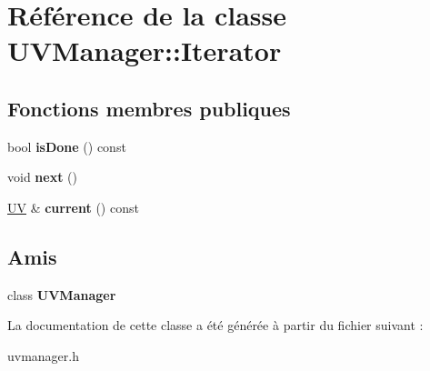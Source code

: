\hypertarget{class_u_v_manager_1_1_iterator}{\section{Référence de la classe U\+V\+Manager\+:\+:Iterator}
\label{class_u_v_manager_1_1_iterator}
}
\subsection*{Fonctions membres publiques}
\begin{DoxyCompactItemize}
\item 
\hypertarget{class_u_v_manager_1_1_iterator_a3ec3a33ce7a203f1cfe41e270c2d5618}{bool {\bfseries is\+Done} () const }\label{class_u_v_manager_1_1_iterator_a3ec3a33ce7a203f1cfe41e270c2d5618}

\item 
\hypertarget{class_u_v_manager_1_1_iterator_a01d51088890a5e83e96407bbc5ca919e}{void {\bfseries next} ()}\label{class_u_v_manager_1_1_iterator_a01d51088890a5e83e96407bbc5ca919e}

\item 
\hypertarget{class_u_v_manager_1_1_iterator_a1629af42307532caed05e2bec601d48d}{\hyperlink{class_u_v}{U\+V} \& {\bfseries current} () const }\label{class_u_v_manager_1_1_iterator_a1629af42307532caed05e2bec601d48d}

\end{DoxyCompactItemize}
\subsection*{Amis}
\begin{DoxyCompactItemize}
\item 
\hypertarget{class_u_v_manager_1_1_iterator_a335ec2026467669b89518b0c67372f3b}{class {\bfseries U\+V\+Manager}}\label{class_u_v_manager_1_1_iterator_a335ec2026467669b89518b0c67372f3b}

\end{DoxyCompactItemize}


La documentation de cette classe a été générée à partir du fichier suivant \+:\begin{DoxyCompactItemize}
\item 
uvmanager.\+h\end{DoxyCompactItemize}
